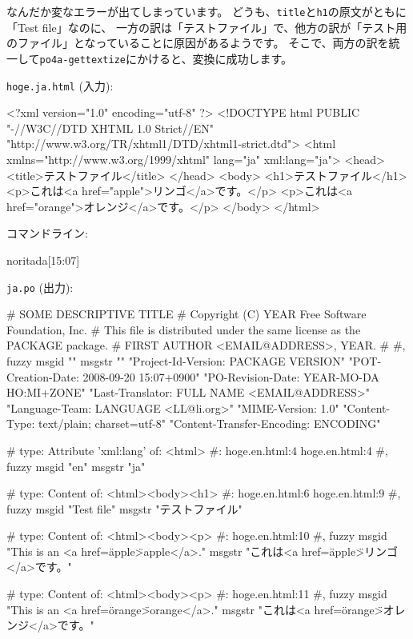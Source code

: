 \documentclass[mingoth,a4paper]{jsarticle}
\begin{document}
なんだか変なエラーが出てしまっています。
どうも、\texttt{title}と\texttt{h1}の原文がともに「Test file」なのに、
一方の訳は「テストファイル」で、他方の訳が「テスト用のファイル」となっていることに原因があるようです。
そこで、両方の訳を統一して\texttt{po4a-gettextize}にかけると、変換に成功します。

\texttt{hoge.ja.html} (入力):

\begin{commandline}
<?xml version="1.0" encoding="utf-8" ?>
<!DOCTYPE html PUBLIC "-//W3C//DTD XHTML 1.0 Strict//EN"
"http://www.w3.org/TR/xhtml1/DTD/xhtml1-strict.dtd">
<html xmlns="http://www.w3.org/1999/xhtml" lang="ja" xml:lang="ja">
<head>
<title>テストファイル</title>
</head>
<body>
<h1>テストファイル</h1>
<p>これは<a href="apple">リンゴ</a>です。</p>
<p>これは<a href="orange">オレンジ</a>です。</p>
</body>
</html>
\end{commandline}

コマンドライン:

\begin{commandline}
noritada[15:07]%
\end{commandline}

\texttt{ja.po} (出力):

\begin{commandline}
# SOME DESCRIPTIVE TITLE
# Copyright (C) YEAR Free Software Foundation, Inc.
# This file is distributed under the same license as the PACKAGE package.
# FIRST AUTHOR <EMAIL@ADDRESS>, YEAR.
#
#, fuzzy
msgid ""
msgstr ""
"Project-Id-Version: PACKAGE VERSION\n"
"POT-Creation-Date: 2008-09-20 15:07+0900\n"
"PO-Revision-Date: YEAR-MO-DA HO:MI+ZONE\n"
"Last-Translator: FULL NAME <EMAIL@ADDRESS>\n"
"Language-Team: LANGUAGE <LL@li.org>\n"
"MIME-Version: 1.0\n"
"Content-Type: text/plain; charset=utf-8\n"
"Content-Transfer-Encoding: ENCODING"

# type: Attribute 'xml:lang' of: <html>
#: hoge.en.html:4 hoge.en.html:4
#, fuzzy
msgid "en"
msgstr "ja"

# type: Content of: <html><body><h1>
#: hoge.en.html:6 hoge.en.html:9
#, fuzzy
msgid "Test file"
msgstr "テストファイル"

# type: Content of: <html><body><p>
#: hoge.en.html:10
#, fuzzy
msgid "This is an <a href=\"apple\">apple</a>."
msgstr "これは<a href=\"apple\">リンゴ</a>です。"

# type: Content of: <html><body><p>
#: hoge.en.html:11
#, fuzzy
msgid "This is an <a href=\"orange\">orange</a>."
msgstr "これは<a href=\"orange\">オレンジ</a>です。"
\end{commandline}
\end{document}
